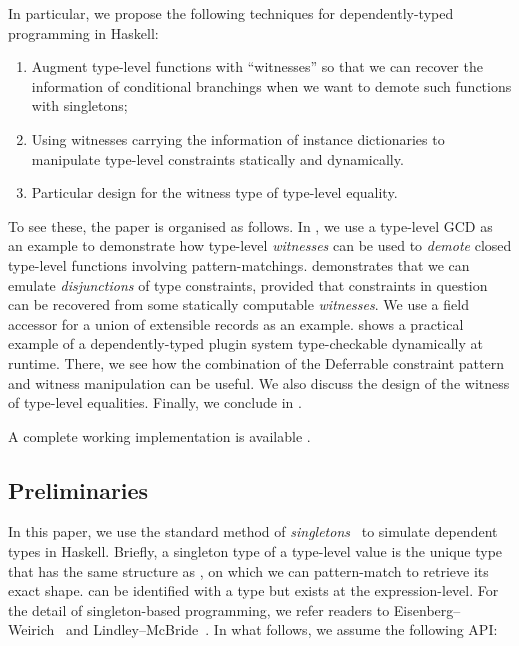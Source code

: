 \documentclass[demotion-paper.tex]{subfiles}
\begin{document}
In particular, we propose the following techniques for dependently-typed programming in Haskell:
\begin{enumerate}
\item Augment type-level functions with ``witnesses'' so that we can recover the information of conditional branchings when we want to demote such functions with singletons;
\item Using witnesses carrying the information of instance dictionaries to manipulate type-level constraints statically and dynamically.
\item Particular design for the witness type of type-level equality.
\end{enumerate}
To see these, the paper is organised as follows.
In , we use a type-level GCD as an example to demonstrate how type-level \emph{witnesses} can be used to \emph{demote} closed type-level functions involving pattern-matchings.
 demonstrates that we can emulate \emph{disjunctions} of type constraints, provided that constraints in question can be recovered from some statically computable \emph{witnesses}.
We use a field accessor for a union of extensible records as an example.
 shows a practical example of a dependently-typed plugin system type-checkable dynamically at runtime.
There, we see how the combination of the Deferrable constraint pattern~\cite{Kmett:2020ab} and witness manipulation can be useful.
We also discuss the design of the witness of type-level equalities.
Finally, we conclude in .

A complete working implementation is available .

\subsection{Preliminaries}
In this paper, we use the standard method of \emph{singletons}~\cite{Eisenberg:2012} to simulate dependent types in Haskell.
Briefly, a singleton type  of a type-level value  is the unique type that has the same structure as , on which we can pattern-match to retrieve its exact shape.
 can be identified with a type  but exists at the expression-level.
For the detail of singleton-based programming, we refer readers to Eisenberg--Weirich~\cite{Eisenberg:2012} and Lindley--McBride~\cite{10.1145/2503778.2503786}.
In what follows, we assume the following API:
\end{document}
